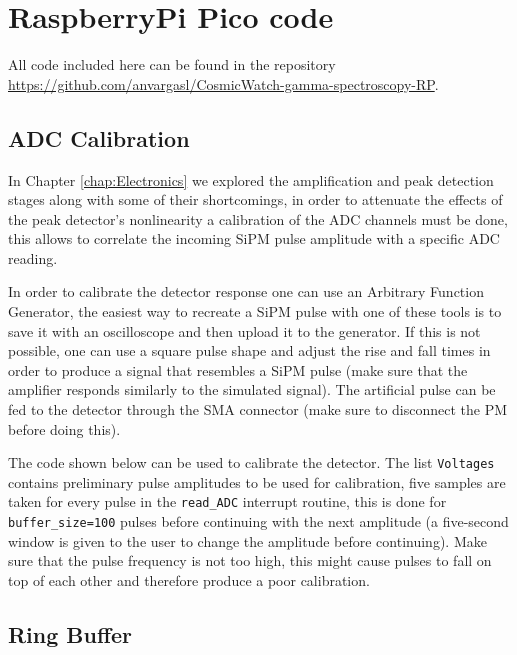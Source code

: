 \chapter{RaspberryPi Pico code}\label{app:RP_Pico_code}

All code included here can be found in the repository \\ \href{https://github.com/anvargasl/CosmicWatch-gamma-spectroscopy-RP}{https://github.com/anvargasl/CosmicWatch-gamma-spectroscopy-RP}.

\section{ADC Calibration}

In Chapter \ref{chap:Electronics} we explored the amplification and peak detection stages along with some of their shortcomings, in order to attenuate the effects of the peak detector's nonlinearity a calibration of the ADC channels must be done, this allows to correlate the incoming SiPM pulse amplitude with a specific ADC reading.

In order to calibrate the detector response one can use an Arbitrary Function Generator, the easiest way to recreate a SiPM pulse with one of these tools is to save it with an oscilloscope and then upload it to the generator. If this is not possible, one can use a square pulse shape and adjust the rise and fall times in order to produce a signal that resembles a SiPM pulse (make sure that the amplifier responds similarly to the simulated signal). The artificial pulse can be fed to the detector through the SMA connector (make sure to disconnect the PM before doing this).

The code shown below can be used to calibrate the detector. The list \texttt{Voltages} contains preliminary pulse amplitudes to be used for calibration, five samples are taken for every pulse in the \texttt{read\_ADC} interrupt routine, this is done for \texttt{buffer\_size=100} pulses before continuing with the next amplitude (a five-second window is given to the user to change the amplitude before continuing). Make sure that the pulse frequency is not too high, this might cause pulses to fall on top of each other and therefore produce a poor calibration.



\section{Ring Buffer}


